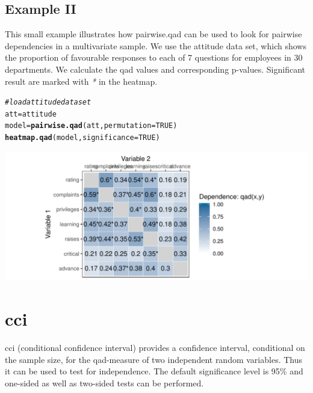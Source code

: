 \documentclass{scrartcl}\usepackage[]{graphicx}\usepackage[]{color}
\makeatletter
\def\maxwidth{ %
  \ifdim\Gin@nat@width>\linewidth
    \linewidth
  \else
    \Gin@nat@width
  \fi
}
\newcommand{\hlnum}[1]{\textcolor[rgb]{0.686,0.059,0.569}{#1}}%
\newcommand{\hlcom}[1]{\textcolor[rgb]{0.678,0.584,0.686}{\textit{#1}}}%
\newcommand{\hlstd}[1]{\textcolor[rgb]{0.345,0.345,0.345}{#1}}%
\newcommand{\hlkwb}[1]{\textcolor[rgb]{0.69,0.353,0.396}{#1}}%
\newcommand{\hlkwc}[1]{\textcolor[rgb]{0.333,0.667,0.333}{#1}}%
\newcommand{\hlkwd}[1]{\textcolor[rgb]{0.737,0.353,0.396}{\textbf{#1}}}%
\newenvironment{kframe}{%
 \def\at@end@of@kframe{}%
 \ifinner\ifhmode%
  \def\at@end@of@kframe{\end{minipage}}%
  \begin{minipage}{\columnwidth}%
 \fi\fi%
 \def\FrameCommand##1{\hskip\@totalleftmargin \hskip-\fboxsep
 \colorbox{shadecolor}{##1}\hskip-\fboxsep
     \hskip-\linewidth \hskip-\@totalleftmargin \hskip\columnwidth}%
 \MakeFramed {\advance\hsize-\width
   \@totalleftmargin\z@ \linewidth\hsize
   \@setminipage}}%
 {\par\unskip\endMakeFramed%
 \at@end@of@kframe}
\newenvironment{knitrout}{}{} %
\makeatother
\begin{document}
\subsection{Example II}
This small example illustrates how pairwise.qad can be used to look for pairwise dependencies in a multivariate sample. We use the attitude data set, which shows the proportion of favourable responses to each of 7 questions for employees in 30 departments. We calculate the qad values and corresponding p-values. Significant result are marked with \textit{*} in the heatmap.
\begin{knitrout}
\color{fgcolor}\begin{kframe}
\begin{alltt}
  \hlcom{#load attitude dataset}
  \hlstd{att} \hlkwb{=} \hlstd{attitude}
  \hlstd{model} \hlkwb{=} \hlkwd{pairwise.qad}\hlstd{(att,} \hlkwc{permutation} \hlstd{=} \hlnum{TRUE}\hlstd{)}
  \hlkwd{heatmap.qad}\hlstd{(model,} \hlkwc{significance} \hlstd{=} \hlnum{TRUE}\hlstd{)}
\end{alltt}
\end{kframe}
\end{knitrout}



\begin{knitrout}
\color{fgcolor}
\includegraphics[width=\maxwidth]{figure/unnamed-chunk-5-1} 

\end{knitrout}

\section{cci}

cci (conditional confidence interval) provides a confidence interval, conditional on the sample size, for the qad-measure of two independent random variables. Thus it can be used to test for independence. The default significance level is 95\% and one-sided as well as two-sided tests can be performed.
\end{document}
